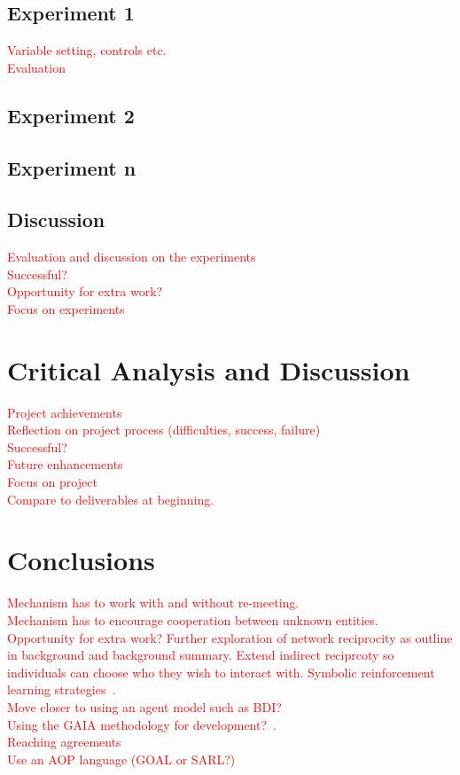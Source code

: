 \documentclass[]{final_report}
\begin{document}
\section{Experiment 1}
\textcolor{red}{Variable setting, controls etc.\\
Evaluation}

\section{Experiment 2}

\section{Experiment n}

\section{Discussion}
\textcolor{red}{Evaluation and discussion on the experiments\\
Successful?\\
Opportunity for extra work?\\
Focus on experiments}

\chapter{Critical Analysis and Discussion}
\textcolor{red}{Project achievements\\
Reflection on project process (difficulties, success, failure)\\
Successful?\\
Future enhancements\\
Focus on project\\
Compare to deliverables at beginning.}

\chapter{Conclusions}
\textcolor{red}{Mechanism has to work with and without re-meeting.\\
Mechanism has to encourage cooperation between unknown entities.\\
Opportunity for extra work? Further exploration of network reciprocity as outline in background and background summary. Extend indirect reciprcoty so individuals can choose who they wish to interact with. Symbolic reinforcement learning strategies~\cite{harper2017reinforcement}.\\
Move closer to using an agent model such as BDI?\\
Using the GAIA methodology for development?~\cite{wooldridge2000gaia}.\\
Reaching agreements\\
Use an AOP language (GOAL or SARL?)}
\end{document}
